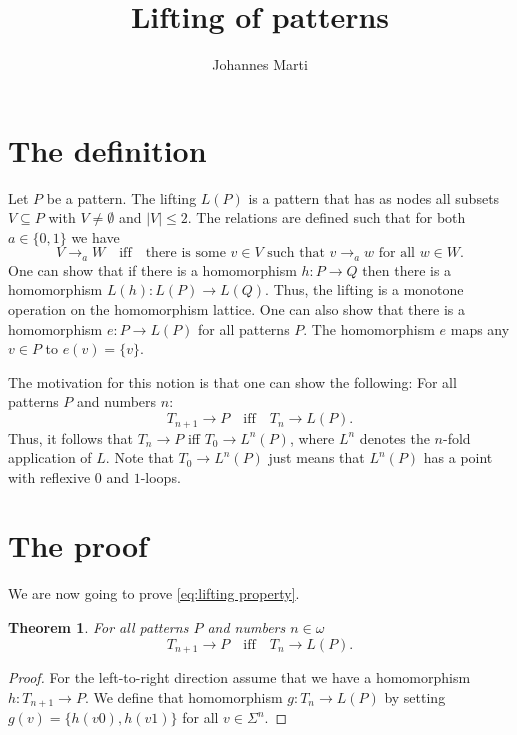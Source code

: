 \documentclass[a4paper]{article}
\title{Lifting of patterns}
\author{Johannes Marti}
\renewcommand{\iff}{\quad \mbox{iff} \quad}
\newtheorem{theorem}{Theorem}
\begin{document}
\maketitle


\section{The definition}

Let $P$ be a pattern. The lifting $L(P)$ is a pattern that has as nodes
all subsets $V \subseteq P$ with $V \neq \emptyset$ and $|V| \leq 2$.
The relations are defined such that for both $a \in \{0,1\}$ we have
\[
 V \rightarrow_a W \iff \mbox{there is some } v \in V \mbox{ such that }
v \rightarrow_a w \mbox{ for all } w \in W.
\]
One can show that if there is a homomorphism $h : P \to Q$ then there is
a homomorphism $L(h) : L(P) \to L(Q)$. Thus, the lifting is a monotone
operation on the homomorphism lattice. One can also show that there is a
homomorphism $e : P \to L(P)$ for all patterns $P$. The homomorphism $e$
maps any $v \in P$ to $e(v) = \{v\}$.

The motivation for this notion is that one can show the following: For
all patterns $P$ and numbers $n$:
\begin{equation} \label{eq:lifting property}
 T_{n + 1} \to P \iff T_n \to L(P).
\end{equation}
Thus, it follows that $T_n \to P$ iff $T_0 \to L^n(P)$, where $L^n$
denotes the $n$-fold application of $L$. Note that $T_0 \to L^n(P)$ just
means that $L^n(P)$ has a point with reflexive $0$ and $1$-loops.


\section{The proof}

We are now going to prove \eqref{eq:lifting property}.
\begin{theorem}
 For all patterns $P$ and numbers $n \in \omega$  
\begin{equation*}
 T_{n + 1} \to P \iff T_n \to L(P).
\end{equation*}
\end{theorem}
\begin{proof}
For the left-to-right direction assume that we have a homomorphism $h :
T_{n + 1} \to P$. We define that homomorphism $g : T_n \to L(P)$ by
setting $g(v) = \{h(v0),h(v1)\}$ for all $v \in \Sigma^n$.

\end{proof}
\end{document}
